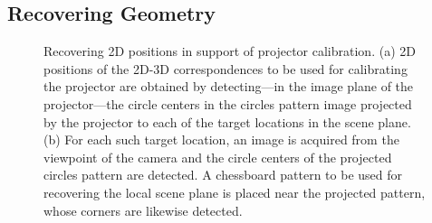 \documentclass[review]{elsarticle}
\begin{document}
\subsection{Recovering Geometry}\label{sec:approach:geometry}

\begin{figure}
    \centering
    \qquad
		\caption{Recovering 2D positions in support of projector calibration. (a) 2D positions of the 2D-3D correspondences to be used for calibrating the projector are obtained by detecting---in the image plane of the projector---the circle centers in the circles pattern image projected by the projector to each of the target locations in the scene plane. (b) For each such target location, an image is acquired from the viewpoint of the camera and the circle centers of the projected circles pattern are detected. A chessboard pattern to be used for recovering the local scene plane is placed near the projected pattern, whose corners are likewise detected.} %
    \label{fig:2d}
\end{figure}
\end{document}

